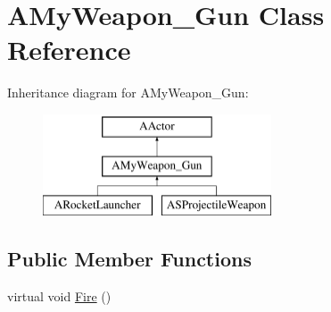 \hypertarget{class_a_my_weapon___gun}{}\section{A\+My\+Weapon\+\_\+\+Gun Class Reference}
\label{class_a_my_weapon___gun}
Inheritance diagram for A\+My\+Weapon\+\_\+\+Gun\+:\begin{figure}[H]
\begin{center}
\leavevmode
\includegraphics[height=3.000000cm]{class_a_my_weapon___gun}
\end{center}
\end{figure}
\subsection*{Public Member Functions}
\begin{DoxyCompactItemize}
\item 
virtual void \mbox{\hyperlink{class_a_my_weapon___gun_a8b430c2ea96f507fa29e2eceb7ebc552}{Fire}} ()
\end{DoxyCompactItemize}
